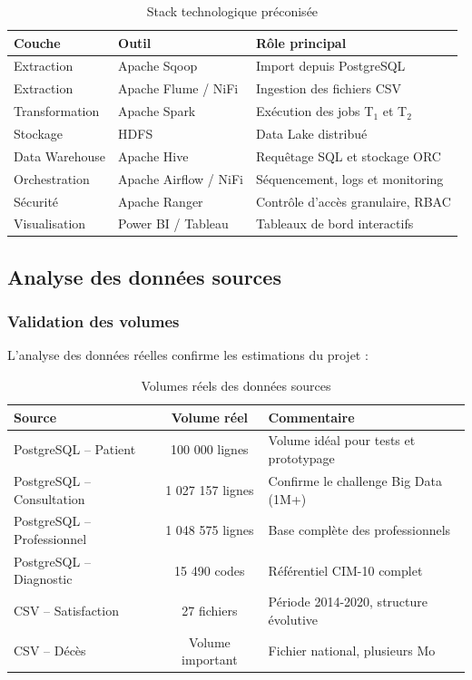 \documentclass[12pt,a4paper]{article}
\begin{document}
\begin{table}[H]
\centering
\caption{Stack technologique préconisée}
\begin{tabularx}{\textwidth}{|l|X|X|}
\hline
\textbf{Couche} & \textbf{Outil} & \textbf{Rôle principal} \\
\hline
Extraction & Apache Sqoop & Import depuis PostgreSQL \\
\hline
Extraction & Apache Flume / NiFi & Ingestion des fichiers CSV \\
\hline
Transformation & Apache Spark & Exécution des jobs T$_{1}$ et T$_{2}$ \\
\hline
Stockage & HDFS & Data Lake distribué \\
\hline
Data Warehouse & Apache Hive & Requêtage SQL et stockage ORC \\
\hline
Orchestration & Apache Airflow / NiFi & Séquencement, logs et monitoring \\
\hline
Sécurité & Apache Ranger & Contrôle d'accès granulaire, RBAC \\
\hline
Visualisation & Power BI / Tableau & Tableaux de bord interactifs \\
\hline
\end{tabularx}
\end{table}

\subsection{Analyse des données sources}

\subsubsection{Validation des volumes}

L'analyse des données réelles confirme les estimations du projet :

\begin{table}[H]
\centering
\caption{Volumes réels des données sources}
\begin{tabularx}{\textwidth}{|l|c|X|}
\hline
\textbf{Source} & \textbf{Volume réel} & \textbf{Commentaire} \\
\hline
PostgreSQL – Patient & 100 000 lignes & Volume idéal pour tests et prototypage \\
\hline
PostgreSQL – Consultation & 1 027 157 lignes & Confirme le challenge Big Data (1M+) \\
\hline
PostgreSQL – Professionnel & 1 048 575 lignes & Base complète des professionnels \\
\hline
PostgreSQL – Diagnostic & 15 490 codes & Référentiel CIM-10 complet \\
\hline
CSV – Satisfaction & 27 fichiers & Période 2014-2020, structure évolutive \\
\hline
CSV – Décès & Volume important & Fichier national, plusieurs Mo \\
\hline
\end{tabularx}
\end{table}
\end{document}
